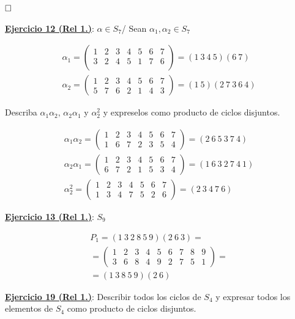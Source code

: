 \documentclass{article}
\begin{document}
$\hfill\square$

\underline{\textbf{Ejercicio 12 (Rel 1.)}}: $\alpha \in S_7$/ Sean $\alpha_1,\alpha_2 \in S_7$

\begin{gather*}
\alpha_1=
\begin{pmatrix}
1 & 2 & 3 & 4 & 5 & 6 & 7 \\
3 & 2 & 4 & 5 & 1 & 7 & 6 \\
\end{pmatrix}
=(1~3~4~5)(6~7) \\
\alpha_2=
\begin{pmatrix}
1 & 2 & 3 & 4 & 5 & 6 & 7 \\
5 & 7 & 6 & 2 & 1 & 4 & 3
\end{pmatrix}
=(1~5)(2~7~3~6~4)
\end{gather*}

Describa $\alpha_1\alpha_2$, $\alpha_2\alpha_1$ y $\alpha_2^2$ y expreselos como producto de ciclos disjuntos.

\begin{gather*}
\alpha_1\alpha_2=
\begin{pmatrix}
1 & 2 & 3 & 4 & 5 & 6 & 7 \\
1 & 6 & 7 & 2 & 3 & 5 & 4
\end{pmatrix}
=(2~6~5~3~7~4) \\
\alpha_2\alpha_1=
\begin{pmatrix}
1 & 2 & 3 & 4 & 5 & 6 & 7 \\
6 & 7 & 2 & 1 & 5 & 3 & 4
\end{pmatrix}
=(1~6~3~2~7~4~1) \\
\alpha_2^2=
\begin{pmatrix}
1 & 2 & 3 & 4 & 5 & 6 & 7 \\
1 & 3 & 4 & 7 & 5 & 2 & 6
\end{pmatrix}
=(2~3~4~7~6)
\end{gather*}

\underline{\textbf{Ejercicio 13 (Rel 1.)}}: $S_9$

\begin{gather*}
P_1=(1~3~2~8~5~9)(2~6~3)= \\
=
\begin{pmatrix}
1 & 2 & 3 & 4 & 5 & 6 & 7 & 8 & 9\\
3 & 6 & 8 & 4 & 9 & 2 & 7 & 5 & 1
\end{pmatrix}
= \\
= (1~3~8~5~9)(2~6)
\end{gather*}

\underline{\textbf{Ejercicio 19 (Rel 1.)}}: Describir todos los ciclos de $S_4$ y expresar todos los elementos de $S_4$ como producto de ciclos disjuntos.
\end{document}
